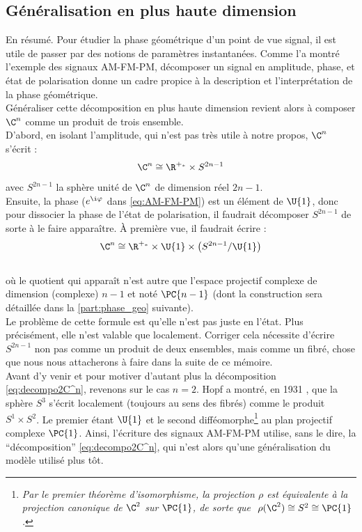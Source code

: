 \subsection{Généralisation en plus haute dimension} \label{subsec:aller_plus_loin}

En résumé. Pour étudier la phase géométrique d'un point de vue signal, il est utile de passer par des notions de paramètres instantanées. Comme l'a montré l'exemple des signaux AM-FM-PM, décomposer un signal en amplitude, phase, et état de polarisation donne un cadre propice à la description et l'interprétation de la phase géométrique.
\\

Généraliser cette décomposition en plus haute dimension revient alors à composer $\C^n$ comme un produit de trois ensemble. 
\\
D'abord, en isolant l'amplitude, qui n'est pas très utile à notre propos, $\C^n$ s'écrit :
\[\C^n \cong \R^{+_*} \times S^{2n-1}\]
avec $S^{2n-1}$ la sphère unité de $\C^n$ de dimension réel $2n-1$.
\\
Ensuite, la phase ($e^{\i \varphi}$ dans \eqref{eq:AM-FM-PM}) est un élément de $\U{1}$, donc pour dissocier la phase de l'état de polarisation, il faudrait décomposer $S^{2n-1}$ de sorte à le faire apparaître. À première vue, il faudrait écrire :
\begin{equation}\label{eq:decompo2C^n}
	\C^n \cong \R^{+_*} \times \U{1} \times \big( S^{2n-1}/\U{1} \big)
\end{equation}
\\
où le quotient qui apparaît n'est autre que l'espace projectif complexe de dimension (complexe) $n-1$ et noté $\PC{n-1}$ (dont la construction sera détaillée dans la \cref{part:phase_geo} suivante).
\\
Le problème de cette formule est qu'elle n'est pas juste en l'état. Plus précisément, elle n'est valable que localement. 
Corriger cela nécessite d'écrire $S^{2n-1}$ non pas comme un produit de deux ensembles, mais comme un fibré, chose que nous nous attacherons à faire dans la suite de ce mémoire.
\\

Avant d'y venir et pour motiver d'autant plus la décomposition \eqref{eq:decompo2C^n}, revenons sur le cas $n=2$. Hopf a montré, en 1931 \cite{hopf_uber_1931}, que la sphère $S^3$ s'écrit localement (toujours au sens des fibrés) comme le produit $S^1\times S^2$. Le premier étant $\U{1}$ et le second difféomorphe\footnote{\itshape
Par le premier théorème d'isomorphisme, la projection $\rho$ est équivalente à la projection canonique de $\C^2$ sur $\PC{1}$, de sorte que $\ \rho(\C^2)\cong S^2\cong \PC{1}$.}
au plan projectif complexe $\PC{1}$.
Ainsi, l'écriture des signaux AM-FM-PM utilise, sans le dire, la ``décomposition'' \eqref{eq:decompo2C^n}, qui n'est alors qu'une généralisation du modèle utilisé plus tôt.
